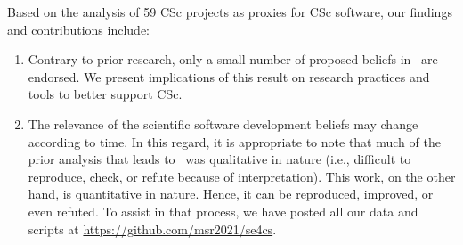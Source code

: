 \documentclass[conference,10pt]{IEEEtran}
\newcommand{\bi}{\begin{itemize}}
\newcommand{\be}{\begin{enumerate}}
\newcommand{\ee}{\end{enumerate}}
\begin{document}
Based on the analysis of 59 CSc projects as proxies for CSc software, our findings and contributions include: 
\be
\item Contrary to prior research, only a small number of proposed beliefs in~\cite{johan18_secs} are endorsed. We present implications of this result on research practices and tools to better support CSc. 
\item The relevance of the scientific software development beliefs may change according to time.
In this regard, it is appropriate to note that
  much of the prior analysis that leads to~ was qualitative in nature (i.e., difficult to reproduce, check, or refute because of interpretation). This work, on the other hand, is quantitative in nature. Hence, it can be reproduced, improved, or even refuted.  To assist in that process, we have posted all our data and scripts at
\url{https://github.com/msr2021/se4cs}. 
\ee



\end{document}
